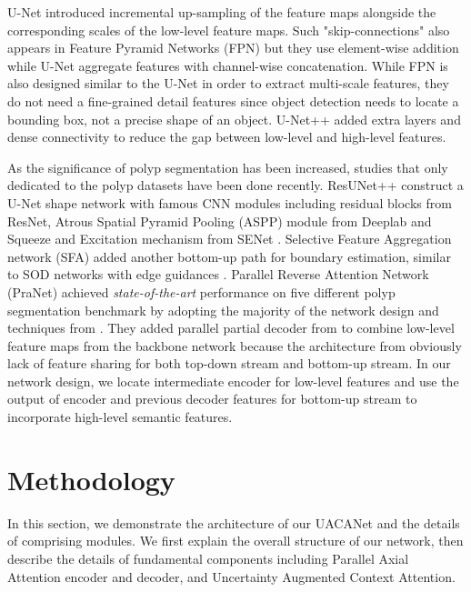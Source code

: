 \documentclass[sigconf]{acmart}
\begin{document}
U-Net \cite{ronneberger2015u} introduced incremental up-sampling of the feature maps alongside the corresponding scales of the low-level feature maps. Such "skip-connections" also appears in Feature Pyramid Networks (FPN) \cite{lin2017feature} but they use element-wise addition while U-Net aggregate features with channel-wise concatenation. While FPN is also designed similar to the U-Net in order to extract multi-scale features, they do not need a fine-grained detail features since object detection needs to locate a bounding box, not a precise shape of an object. U-Net++ \cite{zhou2018unet++} added extra layers and dense connectivity to reduce the gap between low-level and high-level features.

As the significance of polyp segmentation has been increased, studies that only dedicated to the polyp datasets have been done recently. ResUNet++ \cite{jha2019resunet++} construct a U-Net shape network with famous CNN modules including residual blocks from ResNet, Atrous Spatial Pyramid Pooling (ASPP) module from Deeplab and Squeeze and Excitation mechanism from SENet \cite{hu2018squeeze}. Selective Feature Aggregation network (SFA) \cite{10.1007/978-3-030-32239-7_34} added another bottom-up path for boundary estimation, similar to SOD networks with edge guidances \cite{yang2017edge, su2019selectivity}. Parallel Reverse Attention Network (PraNet) \cite{fan2020pranet} achieved \textit{state-of-the-art} performance on five different polyp segmentation benchmark by adopting the majority of the network design and techniques from \cite{chen2018reverse}. They added parallel partial decoder from \cite{wu2019cascaded} to combine low-level feature maps from the backbone network because the architecture from \cite{chen2018reverse} obviously lack of feature sharing for both top-down stream and bottom-up stream. In our network design, we locate intermediate encoder for low-level features and use the output of encoder and previous decoder features for bottom-up stream to incorporate high-level semantic features.


\section{Methodology}
\label{methods}

In this section, we demonstrate the architecture of our UACANet and the details of comprising modules. We first explain the overall structure of our network, then describe the details of fundamental components including Parallel Axial Attention encoder and decoder, and Uncertainty Augmented Context Attention.
\end{document}
